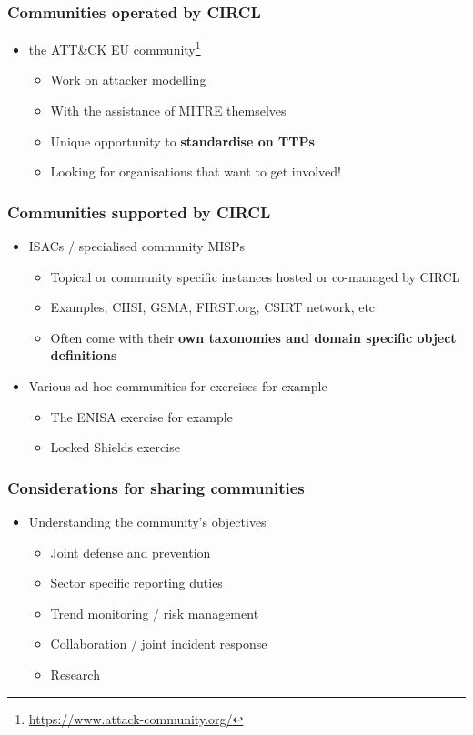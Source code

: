 \begin{frame}
\frametitle{Communities operated by CIRCL}
\begin{itemize}
        \item the ATT\&CK EU community\footnote{\url{https://www.attack-community.org/}}
	\begin{itemize}
		\item Work on attacker modelling
		\item With the assistance of MITRE themselves
		\item Unique opportunity to {\bf standardise on TTPs}
		\item Looking for organisations that want to get involved!
	\end{itemize}
\end{itemize}
\end{frame}

\begin{frame}
\frametitle{Communities supported by CIRCL}
\begin{itemize}
        \item ISACs / specialised community MISPs
        \begin{itemize}
            \item Topical or community specific instances hosted or co-managed by CIRCL
            \item Examples, CIISI, GSMA, FIRST.org, CSIRT network, etc
            \item Often come with their {\bf own taxonomies and domain specific object definitions}
        \end{itemize}
	\item Various ad-hoc communities for exercises for example
	\begin{itemize}
		\item The ENISA exercise for example
                \item Locked Shields exercise
	\end{itemize}
\end{itemize}
\end{frame}

\begin{frame}
\frametitle{Considerations for sharing communities}
\begin{itemize}
	\item Understanding the community's objectives
	\begin{itemize}
		\item Joint defense and prevention
		\item Sector specific reporting duties
		\item Trend monitoring / risk management
		\item Collaboration / joint incident response
                \item Research
	\end{itemize}
\end{itemize}
\end{frame}

